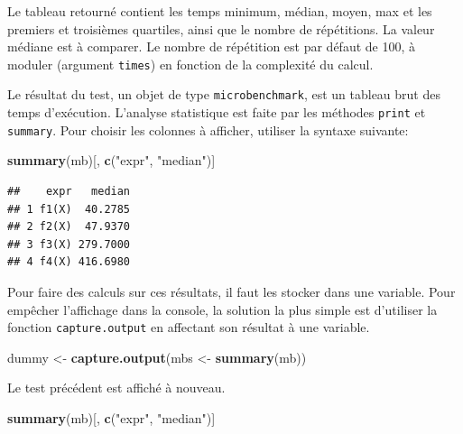 \documentclass[
  12pt,
  french,
  a4paper,
  extrafontsizes,onecolumn,openright
  ]{memoir}
\newenvironment{Shaded}{\begin{snugshade}}{\end{snugshade}}
\newcommand{\KeywordTok}[1]{\textcolor[rgb]{0.13,0.29,0.53}{\textbf{#1}}}
\newcommand{\NormalTok}[1]{#1}
\newcommand{\StringTok}[1]{\textcolor[rgb]{0.31,0.60,0.02}{#1}}
\begin{document}
Le tableau retourné contient les temps minimum, médian, moyen, max et les premiers et troisièmes quartiles, ainsi que le nombre de répétitions.
La valeur médiane est à comparer.
Le nombre de répétition est par défaut de 100, à moduler (argument \texttt{times}) en fonction de la complexité du calcul.

Le résultat du test, un objet de type \texttt{microbenchmark}, est un tableau brut des temps d'exécution.
L'analyse statistique est faite par les méthodes \texttt{print} et \texttt{summary}.
Pour choisir les colonnes à afficher, utiliser la syntaxe suivante:

\scriptsize

\begin{Shaded}
\begin{Highlighting}[]
\KeywordTok{summary}\NormalTok{(mb)[, }\KeywordTok{c}\NormalTok{(}\StringTok{"expr"}\NormalTok{, }\StringTok{"median"}\NormalTok{)]}
\end{Highlighting}
\end{Shaded}

\begin{verbatim}
##    expr   median
## 1 f1(X)  40.2785
## 2 f2(X)  47.9370
## 3 f3(X) 279.7000
## 4 f4(X) 416.6980
\end{verbatim}

\normalsize

Pour faire des calculs sur ces résultats, il faut les stocker dans une variable.
Pour empêcher l'affichage dans la console, la solution la plus simple est d'utiliser la fonction \texttt{capture.output} en affectant son résultat à une variable.

\scriptsize

\begin{Shaded}
\begin{Highlighting}[]
\NormalTok{dummy <-}\StringTok{ }\KeywordTok{capture.output}\NormalTok{(mbs <-}\StringTok{ }\KeywordTok{summary}\NormalTok{(mb))}
\end{Highlighting}
\end{Shaded}

\normalsize

Le test précédent est affiché à nouveau.

\scriptsize

\begin{Shaded}
\begin{Highlighting}[]
\KeywordTok{summary}\NormalTok{(mb)[, }\KeywordTok{c}\NormalTok{(}\StringTok{"expr"}\NormalTok{, }\StringTok{"median"}\NormalTok{)]}
\end{Highlighting}
\end{Shaded}
\end{document}

